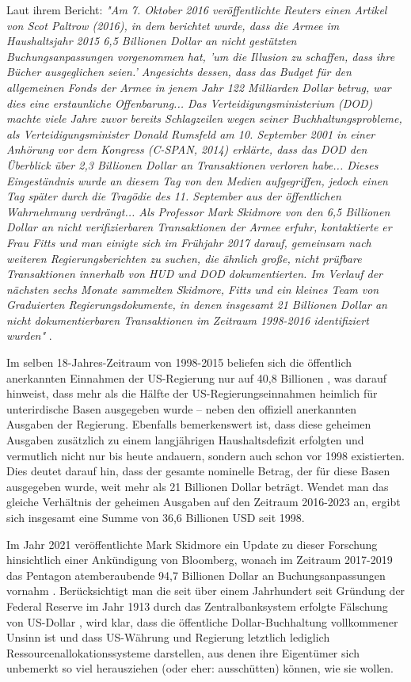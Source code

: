 \documentclass[10pt,twocolumn,letterpaper]{article}
\begin{document}
Laut ihrem Bericht: \textit{"Am 7. Oktober 2016 veröffentlichte Reuters einen Artikel von Scot Paltrow (2016), in dem berichtet wurde, dass die Armee im Haushaltsjahr 2015 6,5 Billionen Dollar an nicht gestützten Buchungsanpassungen vorgenommen hat, 'um die Illusion zu schaffen, dass ihre Bücher ausgeglichen seien.' Angesichts dessen, dass das Budget für den allgemeinen Fonds der Armee in jenem Jahr 122 Milliarden Dollar betrug, war dies eine erstaunliche Offenbarung... Das Verteidigungsministerium (DOD) machte viele Jahre zuvor bereits Schlagzeilen wegen seiner Buchhaltungsprobleme, als Verteidigungsminister Donald Rumsfeld am 10. September 2001 in einer Anhörung vor dem Kongress (C-SPAN, 2014) erklärte, dass das DOD den Überblick über 2,3 Billionen Dollar an Transaktionen verloren habe... Dieses Eingeständnis wurde an diesem Tag von den Medien aufgegriffen, jedoch einen Tag später durch die Tragödie des 11. September aus der öffentlichen Wahrnehmung verdrängt... Als Professor Mark Skidmore von den 6,5 Billionen Dollar an nicht verifizierbaren Transaktionen der Armee erfuhr, kontaktierte er Frau Fitts und man einigte sich im Frühjahr 2017 darauf, gemeinsam nach weiteren Regierungsberichten zu suchen, die ähnlich große, nicht prüfbare Transaktionen innerhalb von HUD und DOD dokumentierten. Im Verlauf der nächsten sechs Monate sammelten Skidmore, Fitts und ein kleines Team von Graduierten Regierungsdokumente, in denen insgesamt 21 Billionen Dollar an nicht dokumentierbaren Transaktionen im Zeitraum 1998-2016 identifiziert wurden"} \cite{12}.

Im selben 18-Jahres-Zeitraum von 1998-2015 beliefen sich die öffentlich anerkannten Einnahmen der US-Regierung nur auf 40,8 Billionen \cite{15}, was darauf hinweist, dass mehr als die Hälfte der US-Regierungseinnahmen heimlich für unterirdische Basen ausgegeben wurde – neben den offiziell anerkannten Ausgaben der Regierung. Ebenfalls bemerkenswert ist, dass diese geheimen Ausgaben zusätzlich zu einem langjährigen Haushaltsdefizit erfolgten und vermutlich nicht nur bis heute andauern, sondern auch schon vor 1998 existierten. Dies deutet darauf hin, dass der gesamte nominelle Betrag, der für diese Basen ausgegeben wurde, weit mehr als 21 Billionen Dollar beträgt. Wendet man das gleiche Verhältnis der geheimen Ausgaben auf den Zeitraum 2016-2023 an, ergibt sich insgesamt eine Summe von 36,6 Billionen USD seit 1998.

Im Jahr 2021 veröffentlichte Mark Skidmore ein Update zu dieser Forschung hinsichtlich einer Ankündigung von Bloomberg, wonach im Zeitraum 2017-2019 das Pentagon atemberaubende 94,7 Billionen Dollar an Buchungsanpassungen vornahm \cite{17,18}. Berücksichtigt man die seit über einem Jahrhundert seit Gründung der Federal Reserve im Jahr 1913 durch das Zentralbanksystem erfolgte Fälschung von US-Dollar \cite{37}, wird klar, dass die öffentliche Dollar-Buchhaltung vollkommener Unsinn ist und dass US-Währung und Regierung letztlich lediglich Ressourcenallokationssysteme darstellen, aus denen ihre Eigentümer sich unbemerkt so viel herausziehen (oder eher: ausschütten) können, wie sie wollen.
\end{document}
